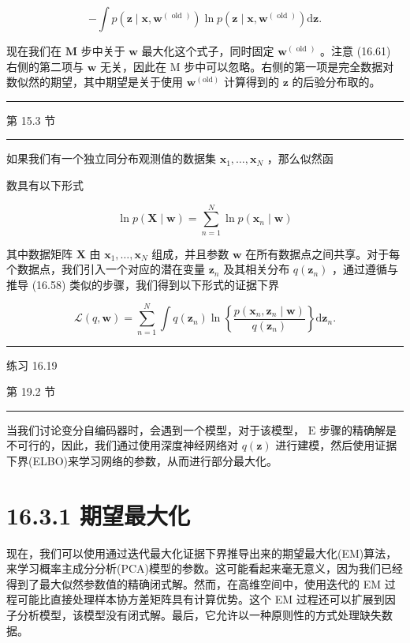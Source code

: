 \documentclass[10pt]{report}
\newcommand{\HRule}{\begin{center}\rule{0.9\linewidth}{0.2mm}\end{center}}
\begin{document}
\[
- \int p\left( {\mathbf{z} \mid  \mathbf{x},{\mathbf{w}}^{\left( \text{ old }\right) }}\right) \ln p\left( {\mathbf{z} \mid  \mathbf{x},{\mathbf{w}}^{\left( \text{ old }\right) }}\right) \mathrm{d}\mathbf{z}. \tag{16.61}
\]

现在我们在 \(\mathbf{M}\) 步中关于 \(\mathbf{w}\) 最大化这个式子，同时固定 \({\mathbf{w}}^{\left( \text{ old }\right) }\) 。注意 (16.61) 右侧的第二项与 \(\mathbf{w}\) 无关，因此在 M 步中可以忽略。右侧的第一项是完全数据对数似然的期望，其中期望是关于使用 \({\mathbf{w}}^{\left( \mathrm{{old}}\right) }\) 计算得到的 \(\mathbf{z}\) 的后验分布取的。

\HRule

第 15.3 节

\HRule

如果我们有一个独立同分布观测值的数据集 \({\mathbf{x}}_{1},\ldots ,{\mathbf{x}}_{N}\) ，那么似然函

数具有以下形式

\[
\ln p\left( {\mathbf{X} \mid  \mathbf{w}}\right)  = \mathop{\sum }\limits_{{n = 1}}^{N}\ln p\left( {{\mathbf{x}}_{n} \mid  \mathbf{w}}\right)  \tag{16.62}
\]

其中数据矩阵 \(\mathbf{X}\) 由 \({\mathbf{x}}_{1},\ldots ,{\mathbf{x}}_{N}\) 组成，并且参数 \(\mathbf{w}\) 在所有数据点之间共享。对于每个数据点，我们引入一个对应的潜在变量 \({\mathbf{z}}_{n}\) 及其相关分布 \(q\left( {\mathbf{z}}_{n}\right)\) ，通过遵循与推导 (16.58) 类似的步骤，我们得到以下形式的证据下界

\[
\mathcal{L}\left( {q,\mathbf{w}}\right)  = \mathop{\sum }\limits_{{n = 1}}^{N}\int q\left( {\mathbf{z}}_{n}\right) \ln \left\{  \frac{p\left( {{\mathbf{x}}_{n},{\mathbf{z}}_{n} \mid  \mathbf{w}}\right) }{q\left( {\mathbf{z}}_{n}\right) }\right\}  \mathrm{d}{\mathbf{z}}_{n}. \tag{16.63}
\]

\HRule

练习 16.19

第 19.2 节

\HRule

当我们讨论变分自编码器时，会遇到一个模型，对于该模型， \(\mathrm{E}\) 步骤的精确解是不可行的，因此，我们通过使用深度神经网络对 \(q\left( \mathbf{z}\right)\) 进行建模，然后使用证据下界(ELBO)来学习网络的参数，从而进行部分最大化。

\section*{16.3.1 期望最大化}

现在，我们可以使用通过迭代最大化证据下界推导出来的期望最大化(EM)算法，来学习概率主成分分析(PCA)模型的参数。这可能看起来毫无意义，因为我们已经得到了最大似然参数值的精确闭式解。然而，在高维空间中，使用迭代的 EM 过程可能比直接处理样本协方差矩阵具有计算优势。这个 EM 过程还可以扩展到因子分析模型，该模型没有闭式解。最后，它允许以一种原则性的方式处理缺失数据。
\end{document}

